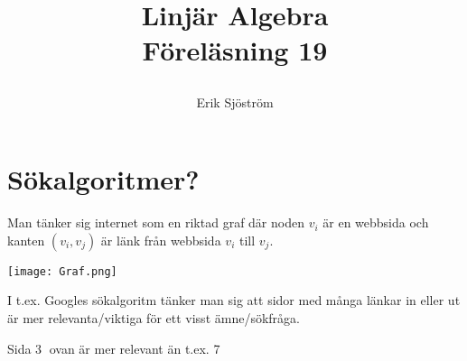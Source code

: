 

\title{
	 Linjär Algebra\\
	 Föreläsning 19
    \author{Erik Sjöström}
}

\maketitle

\section{Sökalgoritmer?} %
\label{sec:_}

Man tänker sig internet som en riktad graf där noden $v_i$ är en webbsida och kanten $(v_i, v_j)$ är länk från webbsida $v_i$ till $v_j$.

\begin{center}
	\texttt{[image: Graf.png]}
\end{center}
\noindent
I t.ex. Googles sökalgoritm tänker man sig att sidor med många länkar in eller ut är mer relevanta/viktiga för ett visst ämne/sökfråga.
\begin{Ex}
    Sida \textcircled{3} ovan är mer relevant än t.ex. \textcircled{7}
\end{Ex}

